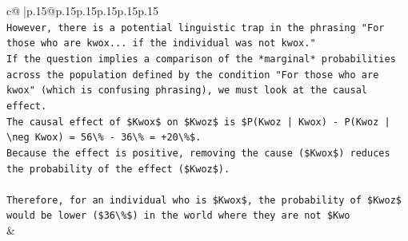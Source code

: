 \documentclass{article}
\begin{document}
{\begin{supertabular}{c@{$\;$}|p{.15\linewidth}@{}p{.15\linewidth}p{.15\linewidth}p{.15\linewidth}p{.15\linewidth}p{.15\linewidth}}
{{{\\ 
\texttt{However, there is a potential linguistic trap in the phrasing "For those who are kwox... if the individual was not kwox."} \\
\texttt{If the question implies a comparison of the *marginal* probabilities across the population defined by the condition "For those who are kwox" (which is confusing phrasing), we must look at the causal effect.} \\
\texttt{The causal effect of \$Kwox\$ on \$Kwoz\$ is \$P(Kwoz | Kwox) {-} P(Kwoz | \textbackslash{}neg Kwox) = 56\textbackslash{}\% {-} 36\textbackslash{}\% = +20\textbackslash{}\%\$.} \\
\texttt{Because the effect is positive, removing the cause (\$Kwox\$) reduces the probability of the effect (\$Kwoz\$).} \\
\\ 
\texttt{Therefore, for an individual who is \$Kwox\$, the probability of \$Kwoz\$ would be lower (\$36\textbackslash{}\%\$) in the world where they are not \$Kwo} \\
            }
        }
    }
    & \\ \\


\end{supertabular}}
\end{document}
